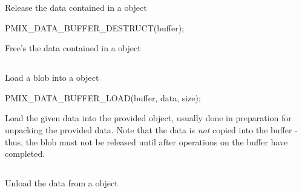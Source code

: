 Release the data contained in a  object

\format

\cspecificstart
\begin{codepar}
PMIX_DATA_BUFFER_DESTRUCT(buffer);
\end{codepar}
\cspecificend

\begin{arglist}
\end{arglist}

\descr

Free's the data contained in a  object


\subsection{}

\summary

Load a blob into a  object

\format

\cspecificstart
\begin{codepar}
PMIX_DATA_BUFFER_LOAD(buffer, data, size);
\end{codepar}
\cspecificend

\begin{arglist}
\end{arglist}

\descr

Load the given data into the provided  object, usually done in preparation for unpacking the provided data. Note that the data is \textit{not} copied into the buffer - thus, the blob must not be released until after operations on the buffer have completed.


\subsection{}

\summary

Unload the data from a  object

